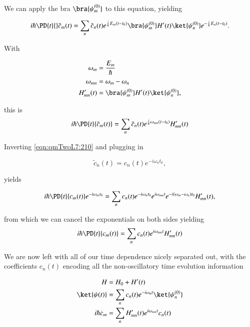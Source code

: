 We can apply the bra $\bra{\psi_m^{(0)}}$ to this equation, yielding

\begin{equation}\label{eqn:qmTwoL7:270}
i \hbar \PD{t}{}
\tilde{c}_m(t)
=
\sum_n
\tilde{c}_n(t)
e^{\frac{i}{\hbar} E_m(t - t_0)}
\bra{\psi_m^{(0)}} H'(t)
\ket{\psi_n^{(0)} }
e^{-\frac{i}{\hbar} E_n(t - t_0)}.
\end{equation}

With

\begin{align}\label{eqn:qmTwoL7:290}
\omega_m &= \frac{E_m}{\hbar} \\
\omega_{mn} &= \omega_m - \omega_n \\
H_{mn}'(t) &= \bra{\psi_m^{(0)}} H'(t) \ket{\psi_n^{(0)} },
\end{align}

this is
\begin{equation}\label{eqn:qmTwoL7:310}
i \hbar \PD{t}{
\tilde{c}_m(t) }
=
\sum_n
\tilde{c}_n(t)
e^{\frac{i}{\hbar} \omega_{mn}(t - t_0)}
H_{mn}'(t)
\end{equation}

Inverting \ref{eqn:qmTwoL7:210} and plugging in

\begin{equation}\label{eqn:qmTwoL7:330}
\tilde{c}_n(t) = c_n(t) e^{-i \omega_n t_0},
\end{equation}

yields

\begin{equation}\label{eqn:qmTwoL7:350}
i \hbar \PD{t}{
c_m(t)
}
e^{-i \omega_m t_0}
=
\sum_n
c_n(t) e^{-i \omega_n t_0}
e^{i\omega_{mn}t}
e^{-i(\omega_m -\omega_n) t_0}
H_{mn}'(t),
\end{equation}

from which we can cancel the exponentials on both sides yielding
\begin{equation}\label{eqn:qmTwoL7:370}
i \hbar \PD{t}{
c_m(t)
}
=
\sum_n
c_n(t)
e^{i\omega_{mn}t}
H_{mn}'(t)
\end{equation}

We are now left with all of our time dependence nicely separated out, with the coefficients $c_n(t)$ encoding all the non-oscillatory time evolution information

\begin{align}\label{eqn:qmTwoL7:390}
H &= H_0 + H'(t) \\
\ket{\psi(t)} &= \sum_n c_n(t) e^{-i\omega_n t} \ket{\psi_n^{(0)}} \\
i \hbar \dot{c}_m &= \sum_n H_{mn}'(t) e^{i \omega_{mn} t} c_n(t)
\end{align}

